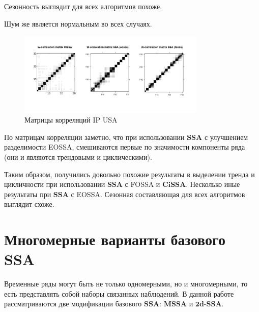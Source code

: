 \documentclass[a4paper, 11pt]{article}
\newcommand{\SSA}{\textbf{SSA}}
\newcommand{\CISSA}{\textbf{CiSSA}}
\newcommand{\MSSA}{\textbf{MSSA}}
\newcommand{\DSSA}{\textbf{2d-SSA}}
\begin{document}
Сезонность выглядит для всех алгоритмов похоже.

Шум же является нормальным во всех случаях.

\begin{figure}[H]
	\centering
	\includegraphics[width=0.8\textwidth]{img/trend inseparability example/W-corr.jpg}
	\caption{Матрицы корреляций IP USA}
	\label{fig:W-corr}
\end{figure}
По матрицам корреляции заметно, что при использовании $\SSA$ с улучшением разделимости EOSSA, смешиваются первые по значимости компоненты ряда (они и являются трендовыми и циклическими). 



Таким образом, получились довольно похожие результаты в выделении тренда и цикличности при использовании $\SSA$ с FOSSA и $\CISSA$. Несколько иные результаты при $\SSA$ с EOSSA. Сезонная составляющая для всех алгоритмов выглядит схоже.
 
\newpage





\section{Многомерные варианты базового SSA}

Временные ряды могут быть не только одномерными, но и многомерными, то есть представлять собой наборы связанных наблюдений. В данной работе рассматриваются две модификации базового $\SSA$:  
$\MSSA$ и $\DSSA$.
\end{document}

